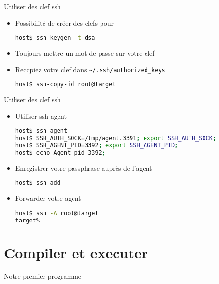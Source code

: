 \begin{frame}[fragile=singleslide]{Utiliser des clef ssh}
  \begin{itemize}
  \item Possibilité de créer des clefs pour 
\begin{lstlisting}[language=sh]
host$ ssh-keygen -t dsa
\end{lstlisting} %
  \item Toujours mettre un mot de passe sur votre clef
  \item Recopiez votre clef dans \verb+~/.ssh/authorized_keys+
\begin{lstlisting}[language=sh]
host$ ssh-copy-id root@target
\end{lstlisting} %
  \end{itemize}
\end{frame}

\begin{frame}[fragile=singleslide]{Utiliser des clef ssh}
  \begin{itemize}
  \item Utiliser ssh-agent
\begin{lstlisting}[language=sh]
host$ ssh-agent
host$ SSH_AUTH_SOCK=/tmp/agent.3391; export SSH_AUTH_SOCK;
host$ SSH_AGENT_PID=3392; export SSH_AGENT_PID;
host$ echo Agent pid 3392;
\end{lstlisting} %
  \item Enregistrer votre passphrase auprès de l'agent
\begin{lstlisting}[language=sh]
host$ ssh-add
\end{lstlisting} %
  \item Forwarder votre agent
\begin{lstlisting}[language=sh]
host$ ssh -A root@target
target%
\end{lstlisting} %
  \end{itemize}
\end{frame}


\section{Compiler et executer}

\begin{frame}[fragile=singleslide]{Notre premier programme}{}
  
\end{frame}

